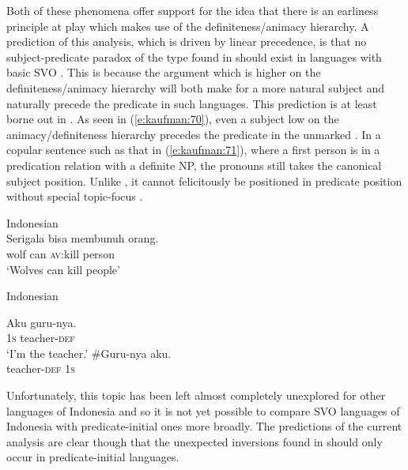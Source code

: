 \documentclass[output=paper]{langsci/langscibook}
\begin{document}
\noindent
Both of these phenomena offer support for the idea that there is an earliness principle at play which makes use of the definiteness/animacy hierarchy. A prediction of this analysis, which is driven by linear precedence, is that no subject-predicate paradox of the type found in  should exist in  languages with basic SVO . This is because the argument which is higher on the definiteness/animacy hierarchy will both make for a more natural subject and naturally precede the predicate in such languages. This prediction is at least borne out in . As seen in (\ref{e:kaufman:70}), even a subject low on the animacy/definiteness hierarchy precedes the predicate in the unmarked . In a copular sentence such as that in (\ref{e:kaufman:71}), where a first person  is in a predication relation with a definite NP, the pronouns still takes the canonical subject position. Unlike , it cannot felicitously be positioned in predicate position without special topic-focus .
\largerpage[2]

\begin{exe}
		\ex\label{e:kaufman:70}{Indonesian}\\
		\gll Serigala bisa membunuh orang.\\
		wolf can \textsc{av}:kill person\\
		\glt `Wolves can kill people'
\end{exe}

\begin{exe}
	\ex\label{e:kaufman:71}{Indonesian} 
	\begin{xlist}
		\ex\label{e:kaufman:71a}
        \gll Aku guru-nya.\\
		\textsc{1s} teacher-\textsc{def}\\
		\glt `I'm the teacher.'
		\ex\label{e:kaufman:71b}
        \gll \#Guru-nya aku.\\
		\phantom{\#}teacher-\textsc{def} \textsc{1s}\\
	\end{xlist}
\end{exe}

\noindent
Unfortunately, this topic has been left almost completely unexplored for other languages of Indonesia and so it is not yet possible to compare SVO languages of Indonesia with predicate-initial ones more broadly. The predictions of the current analysis are clear though that the unexpected inversions found in  should only occur in predicate-initial languages. 
\end{document}
